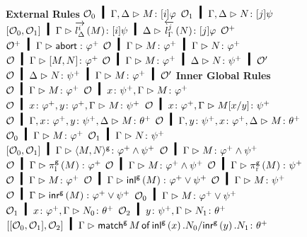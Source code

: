 \begin{figure}[p]
 \small
  \begin{center}
\textbf{External Rules}
\vskip 2mm
\BinaryRule
   {$\hypert_0\hmid\Gamma,\Delta\tr\tj{M}{[i]\varphi}$}
   {$\hypert_1\hmid\Gamma,\Delta\tr\tj{N}{[j]\psi}$}
   {}
   {$\cotuple{\hypert_0,\hypert_1}\hmid\Gamma\tr\tj{\ltor i{l}\Delta{M}}{[i]\psi}\hmid
   \Delta\tr\tj{\rtol j{l}\Gamma {N}}{[j]\varphi}$}
\hfill
 \UnaryRule
 {$\mathcal{O}^+$}
 {}
 {$\hypert^+\hmid\Gamma\tr \tj \abort {\m\varphi}$}
\vskip 2mm
 \UnaryRule
 {$\hypert\hmid\Gamma\tr\tj M {\m\varphi}\hmid\Gamma\tr \tj N {\m\varphi}$}
 {}
 {$\hypert\hmid\Gamma\tr \tj {\cotuple{M,N}}{\m\varphi}$}
\hfill
 \UnaryRule
 {$\hypert\hmid\Gamma\tr M\colon\m\varphi\hmid\Delta\tr N\colon \m\psi\hmid \hypert'$}
 {}
 {$\hypert\hmid\Delta\tr N\colon\m\psi   \hmid\Gamma\tr M\colon \m\varphi\hmid \hypert'$}
 \vskip 2mm
\textbf{Inner Global Rules}
   \vskip 2mm
   \UnaryRule
   {$\hypert\hmid \Gamma\tr\tj M {\m\varphi}$}
   {}
   {$\hypert\hmid \tj x {\m\psi}, \Gamma\tr \tj{M}{\m\varphi}$}
   \hfill
   \UnaryRule
   {$\hypert\hmid \tj{x}{\m\varphi}, \tj{y}{\m\varphi}, \Gamma\tr \tj
   M{\m\psi}$}
   {}
   {$\hypert \hmid \tj{x}{\m\varphi}, \Gamma\tr \tj{M[x/y]}{\m\psi}$}
\vskip 2mm
\UnaryRule
   {$\hypert\hmid\Gamma,\tj x{\m\varphi},\tj y{\m\psi},\Delta\tr
   \tj M{\m\theta}$}{}
   {$\hypert\hmid\Gamma,\tj y{\m\psi},\tj x{\m\varphi},\Delta\tr \tj M{\m\theta}$} %
\hfill
\BinaryRule
   {$\hypert_0\hmid\Gamma\tr \tj M{\m\varphi}$}
   {$\hypert_1\hmid\Gamma\tr \tj N{\m\psi}$}
   {}
   {$\cotuple{\hypert_0,\hypert_1}\hmid\Gamma\tr
     \tj{\gpair{M,N}}{\m\varphi\wedge\m\psi}$}
   \vskip 2mm
  \UnaryRule
   {$\hypert\hmid\Gamma\tr M\colon\m\varphi\wedge\m\psi$}
   {}
   {$\hypert\hmid\Gamma\tr \gpil{M}\colon\m\varphi$}
   \hfill
  \UnaryRule
   {$\hypert\hmid\Gamma\tr M\colon\m\varphi\wedge\m\psi$}
   {}
   {$\hypert\hmid\Gamma\tr\gpir M\colon\m\psi$}
\vskip 2mm
  \UnaryRule
   {$\hypert\hmid\Gamma\tr M\colon\m\varphi$}
   {}
   {$\hypert\hmid\Gamma\tr\ginl{M}\colon\m\varphi\vee\m\psi$}
   \hfill
  \UnaryRule
   {$\hypert\hmid\Gamma\tr M\colon\m\psi$}
   {}
   {$\hypert\hmid\Gamma\tr \ginr{M}\colon\m\varphi\vee\m\psi$}
\vskip 2mm
\TrinaryRule
   {$\hypert_0\hmid\Gamma\tr \tj M {\m\varphi\vee\m\psi}$}
   {$\hypert_1\hmid\tj x{\m\varphi},\Gamma\tr \tj {N_0}{\m\theta}$}
   {$\hypert_2\hmid\tj y{\m\psi},   \Gamma\tr \tj {N_1}{\m\theta}$}
   {}
   {$\cotuple{\cotuple{\hypert_0,\hypert_1},\hypert_2}\hmid\Gamma \tr \tj{\gmat M x {N_0} y {N_1}}{\m\theta}$}

\end{center}
\end{figure}
